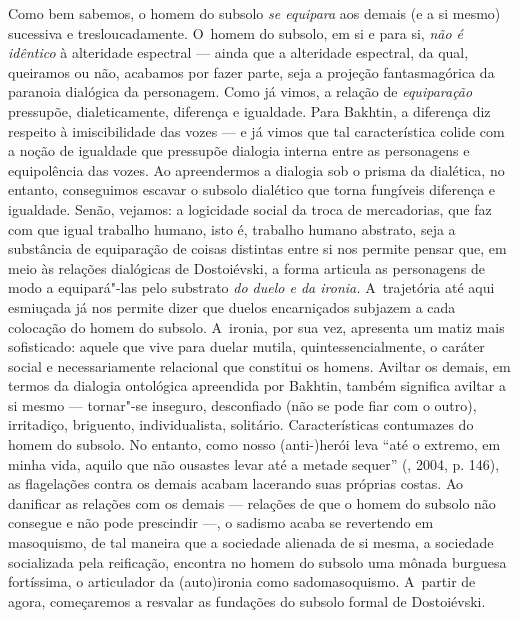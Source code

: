 Como bem sabemos, o homem do subsolo \emph{se equipara} aos demais (e a
si mesmo) sucessiva e tresloucadamente. O~homem do subsolo, em si e para
si, \emph{não é idêntico} à alteridade espectral --- ainda que a
alteridade espectral, da qual, queiramos ou não, acabamos por fazer
parte, seja a projeção fantasmagórica da paranoia dialógica da
personagem. Como já vimos, a relação de \emph{equiparação} pressupõe,
dialeticamente, diferença e igualdade. Para Bakhtin, a diferença diz
respeito à imiscibilidade das vozes --- e já vimos que tal característica
colide com a noção de igualdade que pressupõe dialogia interna entre as
personagens e equipolência das vozes. Ao apreendermos a dialogia sob o
prisma da dialética, no entanto, conseguimos escavar o subsolo dialético
que torna fungíveis diferença e igualdade. Senão, vejamos: a logicidade
social da troca de mercadorias, que faz com que igual trabalho humano,
isto é, trabalho humano abstrato, seja a substância de equiparação de
coisas distintas entre si nos permite pensar que, em meio às relações
dialógicas de Dostoiévski, a forma articula as personagens de modo a
equipará"-las pelo substrato \emph{do duelo e da ironia.} A~trajetória
até aqui esmiuçada já nos permite dizer que duelos encarniçados subjazem
a cada colocação do homem do subsolo. A~ironia, por sua vez, apresenta
um matiz mais sofisticado: aquele que vive para duelar mutila,
quintessencialmente, o caráter social e necessariamente relacional que
constitui os homens. Aviltar os demais, em termos da dialogia ontológica
apreendida por Bakhtin, também significa aviltar a si mesmo --- tornar"-se
inseguro, desconfiado (não se pode fiar com o outro), irritadiço,
briguento, individualista, solitário. Características contumazes do
homem do subsolo. No entanto, como nosso \mbox{(anti-)herói} leva ``até o
extremo, em minha vida, aquilo que não ousastes levar até a metade
sequer'' (, 2004, p. 146), as flagelações contra os demais
acabam lacerando suas próprias costas. Ao danificar as relações com os
demais --- relações de que o homem do subsolo não consegue e não pode
prescindir ---, o sadismo acaba se revertendo em masoquismo, de tal
maneira que a sociedade alienada de si mesma, a sociedade socializada
pela reificação, encontra no homem do subsolo uma mônada burguesa
fortíssima, o articulador da (auto)ironia como sadomasoquismo. A~partir
de agora, começaremos a resvalar as fundações do subsolo formal de
Dostoiévski.

